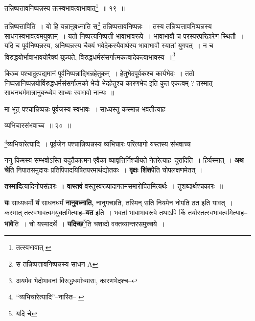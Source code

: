 \documentclass[article,12pt,a4paper]{memoir}
\begin{document}
	  \bigskip
	  \begingroup
	

	  \pstart तन्निष्पत्तावनिष्पन्नस्य तत्स्वभावत्वाभावात्\footnote{तत्स्वभावात् \cite{dp-msC}} ॥ १९ ॥
	\pend
      
	  \endgroup
	 

	  \pstart तन्निष्पत्ताविति । यो हि यन्नानुबध्नाति स\footnote{स तन्निष्पत्तावनिष्पन्नस्य साधन A} तन्निष्पत्तावनिष्पन्नः । तस्य तन्निष्पत्तावनिष्पन्नस्य साधनस्वभावत्वमयुक्तम् । यतो निष्पत्त्यनिष्पत्ती भावाभावरूपे । भावाभावौ च परस्परपरिहारेण स्थितौ । यदि च पूर्वनिष्पन्नस्य, अनिष्पन्नस्य चैक्यं भवेदेकस्यैवार्थस्य भावाभावौ स्यातां युगपत् । न च विरुद्धयोर्भावाभावयोरैक्यं युज्यते, विरुद्धधर्मसंसर्गात्मकत्वादेकत्वाभावस्य ।\footnote{अयमेव भेदोभावनां विरुद्धधर्माध्यासः, कारणभेदश्च--\cite{dp-msD-n}}
	\pend
       

	  \pstart किञ्च पश्चादुत्पद्यमानं पूर्वनिष्पन्नाद्भिन्नहेतुकम् । हेतुभेदपूर्वकश्च कार्यभेदः । ततो निष्पन्नानिष्पन्नयोर्विरुद्धधर्मसंसर्गात्मको भेदो भेदहेतुश्च कारणभेद इति कुत एकत्वम् ? तस्मात् साधनधर्ममात्रानुबन्ध्येव साध्यः स्वभावो नान्यः ॥
	\pend
       

	  \pstart मा भूत् पश्चान्निष्पन्नः पूर्वजस्य स्वभावः । साध्यस्तु कस्मान्न भवतीत्याह--
	\pend
       
	  \bigskip
	  \begingroup
	

	  \pstart व्यभिचारसंभवाच्च ॥ २० ॥
	\pend
      
	  \endgroup
	 

	  \pstart \footnote{“व्यभिचारेत्यादि”--नास्ति--\cite{dp-msA} \cite{dp-msB} \cite{dp-msD} \cite{dp-edP} \cite{dp-edH} \cite{dp-edE} \cite{dp-edN}}\-व्यभिचारेत्यादि । पूर्वजेन पश्चान्निष्पन्नस्य व्यभिचारः परित्यागो यस्तस्य संभवाच्च
	\pend
      
	  \endgroup
	

	  \pstart ननु किमस्य सम्भवोऽस्ति यदुतैकात्मन एवैका व्यावृत्तिर्निश्चीयते नेतरेत्याह--दूरादिति । हिर्यस्मात् । \textbf{अथ चे}ति निपातसमुदायः प्रतिपिपादयिषितपरमार्थद्योतकः । \textbf{वृक्षः शिंशपे}ति चोपलक्षणमेतत् ।
	\pend
      

	  \pstart \textbf{तस्मादि}त्यादिनोपसंहारः । \textbf{वास्तवं} वस्तुस्वरूपादागतमसमारोपितमित्यर्थः । तुशब्दार्थश्चकारः ॥
	\pend
      

	  \pstart \textbf{यः} साध्यधर्मो \textbf{यं} साधनधर्मं \textbf{नानुबध्नाति,} नानुगच्छति, तस्मिन् सति नियमेन नोपति ठत इति यावत् । कस्मात् तत्स्वभावत्वमयुक्तमित्याह--\textbf{यत} इति । भवतां भावाभावरूपे तथाऽपि किं तयोस्तत्स्वभावत्वमित्याह--\textbf{भावे}ति । चो यस्मादर्थे । \textbf{यदिच्छ}\footnote{यदि चे}\-ति चशब्दो वक्तव्यान्तरसमुच्चये ।
	\pend
	  \bigskip
	  \begingroup
	
\end{document}
